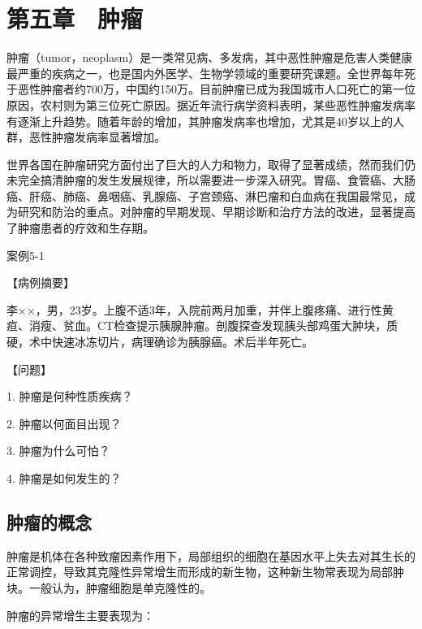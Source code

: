 \chapter{第五章　肿瘤}


肿瘤（tumor，neoplasm）是一类常见病、多发病，其中恶性肿瘤是危害人类健康最严重的疾病之一，也是国内外医学、生物学领域的重要研究课题。全世界每年死于恶性肿瘤者约700万，中国约150万。目前肿瘤已成为我国城市人口死亡的第一位原因，农村则为第三位死亡原因。据近年流行病学资料表明，某些恶性肿瘤发病率有逐渐上升趋势。随着年龄的增加，其肿瘤发病率也增加，尤其是40岁以上的人群，恶性肿瘤发病率显著增加。

世界各国在肿瘤研究方面付出了巨大的人力和物力，取得了显著成绩，然而我们仍未完全搞清肿瘤的发生发展规律，所以需要进一步深入研究。胃癌、食管癌、大肠癌、肝癌、肺癌、鼻咽癌、乳腺癌、子宫颈癌、淋巴瘤和白血病在我国最常见，成为研究和防治的重点。对肿瘤的早期发现、早期诊断和治疗方法的改进，显著提高了肿瘤患者的疗效和生存期。

\begin{framed}
{案例5-1}

{【病例摘要】}

李××，男，23岁。上腹不适3年，入院前两月加重，并伴上腹疼痛、进行性黄疸、消瘦、贫血。CT检查提示胰腺肿瘤。剖腹探查发现胰头部鸡蛋大肿块，质硬，术中快速冰冻切片，病理确诊为胰腺癌。术后半年死亡。

{【问题】}

1. 肿瘤是何种性质疾病？

2. 肿瘤以何面目出现？

3. 肿瘤为什么可怕？

4. 肿瘤是如何发生的？
\end{framed}
\section{肿瘤的概念}

肿瘤是机体在各种致瘤因素作用下，局部组织的细胞在基因水平上失去对其生长的正常调控，导致其克隆性异常增生而形成的新生物，这种新生物常表现为局部肿块。一般认为，肿瘤细胞是单克隆性的。

肿瘤的异常增生主要表现为：

